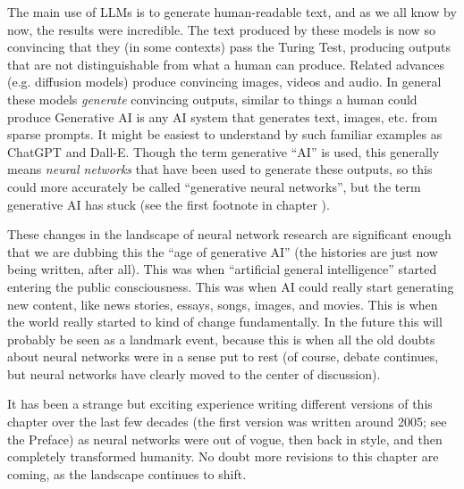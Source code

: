 The main use of LLMs is to generate human-readable text, and as we all know by now, the results were incredible. The text produced by these models is now so convincing that they (in some contexts) pass the Turing Test, producing outputs that are not distinguishable from what a human can produce. Related advances (e.g. diffusion models) produce convincing images, videos and audio.  In general these models \emph{generate} convincing outputs, similar to things a human could produce Generative AI is any AI system that generates text, images, etc. from sparse prompts. It might be easiest to understand by such familiar examples as ChatGPT and Dall-E.  Though the term generative ``AI'' is used, this generally means \emph{neural networks} that have been used to generate these outputs, so this could more accurately be called ``generative neural networks'', but the term generative AI has stuck (see the first footnote in chapter ).

These changes in the landscape of neural network research are significant enough that we are dubbing this the ``age of generative AI'' (the histories are just now being written, after all). This was when ``artificial general intelligence'' started entering the public consciousness. This was when AI could really start generating new content, like news stories, essays, songs, images, and movies. This is when the world really started to kind of change fundamentally. In the future this will probably be seen as a landmark event, because this is when all the old doubts about neural networks were in a sense put to rest (of course, debate continues, but neural networks have clearly moved to the center of discussion). 

It has been a strange but exciting experience writing different versions of this chapter over the last few decades (the first version was written around 2005; see the Preface) as neural networks were out of vogue, then back in style, and then completely transformed humanity. No doubt more revisions to this chapter are coming, as the landscape continues to shift.
